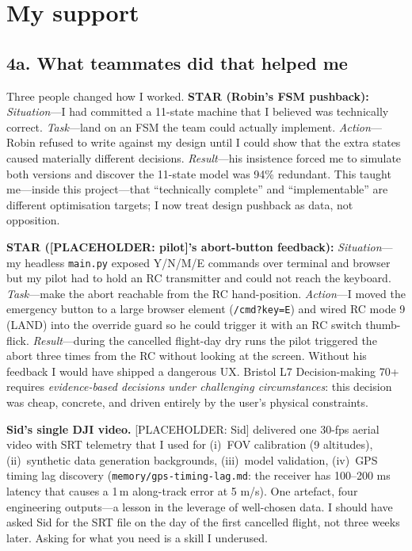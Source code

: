 \section{My support}

\subsection*{4a. What teammates did that helped me }
\www Three people changed how I worked. \textbf{STAR (Robin's FSM pushback):} \emph{Situation}---I had committed a 11-state machine that I believed was technically correct. \emph{Task}---land on an FSM the team could actually implement. \emph{Action}---Robin refused to write against my design until I could show that the extra states caused materially different decisions. \emph{Result}---his insistence forced me to simulate both versions and discover the 11-state model was 94\% redundant. This taught me---inside this project---that ``technically complete'' and ``implementable'' are different optimisation targets; I now treat design pushback as data, not opposition.

\www \textbf{STAR ([PLACEHOLDER: pilot]'s abort-button feedback):} \emph{Situation}---my headless \texttt{main.py} exposed Y/N/M/E commands over terminal and browser but my pilot had to hold an RC transmitter and could not reach the keyboard. \emph{Task}---make the abort reachable from the RC hand-position. \emph{Action}---I moved the emergency button to a large browser element (\texttt{/cmd?key=E}) and wired RC mode 9 (LAND) into the override guard so he could trigger it with an RC switch thumb-flick. \emph{Result}---during the cancelled flight-day dry runs the pilot triggered the abort three times from the RC without looking at the screen. Without his feedback I would have shipped a dangerous UX. Bristol L7 Decision-making 70+ requires \emph{evidence-based decisions under challenging circumstances}: this decision was cheap, concrete, and driven entirely by the user's physical constraints.

\www \textbf{Sid's single DJI video.} [PLACEHOLDER: Sid] delivered one 30-fps aerial video with SRT telemetry that I used for (i)~FOV calibration (9 altitudes), (ii)~synthetic data generation backgrounds, (iii)~model validation, (iv)~GPS timing lag discovery (\texttt{memory/gps-timing-lag.md}: the receiver has 100--200 ms latency that causes a 1\,m along-track error at 5 m/s). One artefact, four engineering outputs---a lesson in the leverage of well-chosen data.
\ebi I should have asked Sid for the SRT file on the day of the first cancelled flight, not three weeks later. Asking for what you need is a skill I underused.

